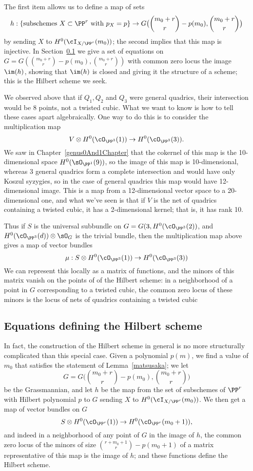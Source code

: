 The first item allows us to define a  map of sets
$$
h : \left\{ \text{subschemes $X \subset \PP^r$ with $p_X=p$} \right\}  \to G\big(\binom{m_0+r}{r} - p(m_0),\binom{m_0+r}{r} \big)
$$
by sending $X$ to $H^0(\cI_{X/\PP^r}(m_0))$; the second implies that this map is injective.  In Section~\ref{eqns of Hilb} we give a set of equations on $G = G(\binom{m_0+r}{r} - p(m_0), \binom{m_0+r}{r})$ with common zero locus the image $\im(h)$, showing that $\im(h)$ is closed and giving it the structure of a scheme; this is the Hilbert scheme we seek.


We observed above that if $Q_1, Q_2$ and $Q_3$ were general quadrics, their intersection would be
8 points,  not a twisted cubic. What we want to know is how to tell these cases apart algebraically. One way to do this is to consider the multiplication map
$$
V \otimes H^0(\cO_{\PP^3}(1)) \to H^0(\cO_{\PP^3}(3)).
$$
We saw in Chapter~\ref{genus0And1Chapter} that the cokernel of this map is the 10-dimensional space $H^0(\sO_{\PP^1}(9))$, so the image of this map is 10-dimensional, whereas
3 general quadrics form a complete intersection and would have only Koszul syzygies, so
in the case of general quadrics this map would have 12-dimensional image.
This is a map from a 12-dimensional vector space to a 20-dimensional one, and what we've seen is that if $V$ is the net of quadrics containing a twisted cubic, it has a 2-dimensional kernel; that is, it has rank 10. 

Thus if $S$ is the universal subbundle on $G = G(3, H^0(\cO_{\PP^3}(2))$, and  $H^0(\cO_{\PP^3}(d))\otimes \sO_G$ is the trivial bundle, then the multiplication map above gives a map of vector bundles
$$
\mu: S \otimes H^0(\cO_{\PP^3}(1)) \to H^0(\cO_{\PP^3}(3))
$$
We can represent this locally as a matrix of functions, and the minors of this matrix vanish on the points of
of the Hilbert scheme: in a neighborhood of a point in $G$ corresponding to a twisted cubic, the common zero locus of these minors is the locus of nets of quadrics containing a twisted cubic

\subsection{Equations defining the Hilbert scheme}\label{eqns of Hilb}

In fact, the construction of the Hilbert scheme in general is no more structurally complicated than this special case. Given a polynomial $p(m)$, we find a value of $m_0$ that satisfies the statement of Lemma~\ref{matsusaka}; we let
$$
G = G\big(\binom{m_0+r}{r} - p(m_0), \binom{m_0+r}{r} \big)
$$
be the Grassmannian, and let $h$ be the map from the set of subschemes of $\PP^r$ with Hilbert polynomial $p$ to $G$ sending $X$ to $H^0(\cI_{X/\PP^r}(m_0))$. We then get a map of vector bundles  on $G$
$$
S \otimes H^0(\cO_{\PP^r}(1)) \to H^0(\cO_{\PP^r}(m_0+1)),
$$
and indeed in a neighborhood of any point of $G$ in the image of $h$, the common zero locus of the minors of size $\binom{r+m_0+1}{r} - p(m_0+1)$ of a matrix representative of this map is the image of $h$; and these functions define the Hilbert scheme.

